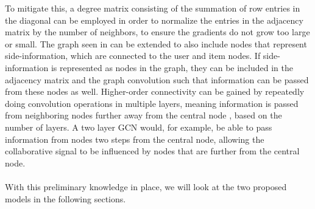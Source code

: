 To mitigate this, a degree matrix consisting of the summation of row entries in the diagonal can be employed in order to normalize the entries in the adjacency matrix by the number of neighbors, to ensure the gradients do not grow too large or small.
The graph seen in  can be extended to also include nodes that represent side-information, which are connected to the user and item nodes.
If side-information is represented as nodes in the graph, they can be included in the adjacency matrix and the graph convolution such that information can be passed from these nodes as well.
Higher-order connectivity can be gained by repeatedly doing convolution operations in multiple layers, meaning information is passed from neighboring nodes further away from the central node \cite{SimplifyingGCN, KOrderConnectivity}, based on the number of layers.
A two layer GCN would, for example, be able to pass information from nodes two steps from the central node, allowing the collaborative signal to be influenced by nodes that are further from the central node.\\\\
With this preliminary knowledge in place, we will look at the two proposed models in the following sections.
